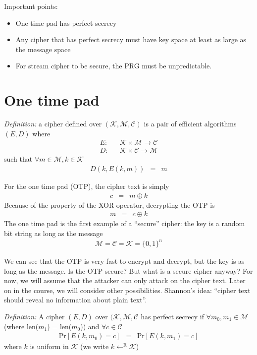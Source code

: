 \documentclass{article}
\begin{document}
Important points:
\begin{itemize}
\item One time pad has perfect secrecy
\item Any cipher that has perfect secrecy must have key space at least as large
as the message space
\item For stream cipher to be secure, the PRG must be unpredictable.
\end{itemize}
\section{One time pad}

\emph{Definition:} a cipher defined over $(\mathcal{K, M, C})$ is a pair of 
efficient algorithms $(E,D)$ where
\begin{eqnarray}
E:&& \mathcal{K} \times \mathcal{M} \to \mathcal{C} \\
D:&& \mathcal{K} \times \mathcal{C} \to \mathcal{M}
\end{eqnarray}
such that $ \forall m \in \mathcal{M}, k \in \mathcal{K}$
\begin{eqnarray}
D(k, E(k, m)) &=& m
\end{eqnarray}

For the one time pad (OTP), the cipher text is simply
\begin{eqnarray}
c &=& m \oplus k
\end{eqnarray}
Because of the property of the XOR operator, decrypting the OTP is 
\begin{eqnarray}
m &=& c \oplus k
\end{eqnarray}
The one time pad is the first example of a ``secure'' cipher: the key is 
a random bit string as long as the message
\begin{eqnarray}
\mathcal{M} = \mathcal{C} = \mathcal{K} = \lbrace 0,1 \rbrace^n
\end{eqnarray}

We can see that the OTP is very fast to encrypt and decrypt, but the key is as
long as the message. Is the OTP secure? But what is a secure cipher anyway?
For now, we will assume that the attacker can only attack on the cipher text.
Later on in the course, we will consider other possibilities. Shannon's idea:
``cipher text should reveal no information about plain text''.

\emph{Definition:} A cipher $(E, D)$ over $(\mathcal{K, M, C}$ has perfect 
secrecy if $\forall m_0, m_1 \in \mathcal{M}$ (where len($m_1$) = len($m_0$)) 
and $\forall c \in \mathcal{C}$
\begin{eqnarray}
\text{Pr}[ E(k, m_0) = c ] &=& \text{Pr} [E(k, m_1) = c]
\end{eqnarray}
where $k$ is uniform in $\mathcal{K}$ (we write $k \leftarrow^\text{R} 
\mathcal{K}$)
\end{document}
